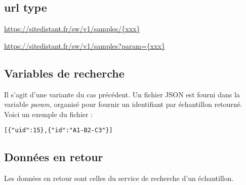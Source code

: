 \subsection{url type}
\url{https://sitedistant.fr/sw/v1/samples/{xxx}}

\url{https://sitedistant.fr/sw/v1/samples?param={xxx}}

\subsection{Variables de recherche}
Il s'agit d'une variante du cas précédent. Un fichier JSON est fourni dans la variable \textit{param}, organisé pour fournir un identifiant par échantillon retourné. Voici un exemple du fichier :
\begin{lstlisting}
[{"uid":15},{"id":"A1-B2-C3"}]
\end{lstlisting}
\subsection{Données en retour}
Les données en retour sont celles du service de recherche d'un échantillon.

